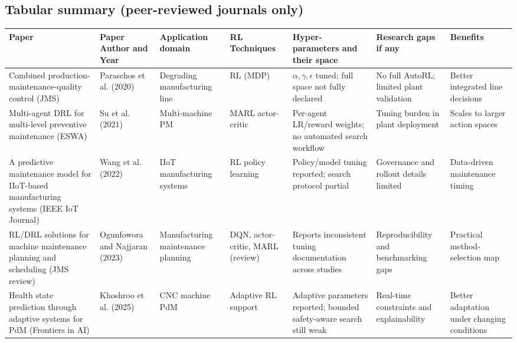 \documentclass[11pt]{article}
\begin{document}
\begin{spacing}{1.05}
\subsection*{Tabular summary (peer-reviewed journals only)}
\tiny
\renewcommand{\arraystretch}{1.1}
\begin{longtable}{p{}p{}p{}p{}p{}p{}p{}}
\toprule
\textbf{Paper} & \textbf{Paper Author and Year} & \textbf{Application domain} & \textbf{RL Techniques} & \textbf{Hyper-parameters and their space} & \textbf{Research gaps if any} & \textbf{Benefits} \\
\midrule
Combined production-maintenance-quality control (JMS) & Paraschos et al. (2020) & Degrading manufacturing line & RL (MDP) & $\alpha, \gamma, \epsilon$ tuned; full space not fully declared & No full AutoRL; limited plant validation & Better integrated line decisions \\

Multi-agent DRL for multi-level preventive maintenance (ESWA) & Su et al. (2021) & Multi-machine PM & MARL actor-critic & Per-agent LR/reward weights; no automated search workflow & Tuning burden in plant deployment & Scales to larger action spaces \\

A predictive maintenance model for IIoT-based manufacturing systems (IEEE IoT Journal) & Wang et al. (2022) & IIoT manufacturing systems & RL policy learning & Policy/model tuning reported; search protocol partial & Governance and rollout details limited & Data-driven maintenance timing \\

RL/DRL solutions for machine maintenance planning and scheduling (JMS review) & Ogunfowora and Najjaran (2023) & Manufacturing maintenance planning & DQN, actor-critic, MARL (review) & Reports inconsistent tuning documentation across studies & Reproducibility and benchmarking gaps & Practical method-selection map \\

Health state prediction through adaptive systems for PdM (Frontiers in AI) & Khoshroo et al. (2025) & CNC machine PdM & Adaptive RL support & Adaptive parameters reported; bounded safety-aware search still weak & Real-time constraints and explainability & Better adaptation under changing conditions \\
\bottomrule
\end{longtable}
\normalsize


\end{spacing}
\end{document}
